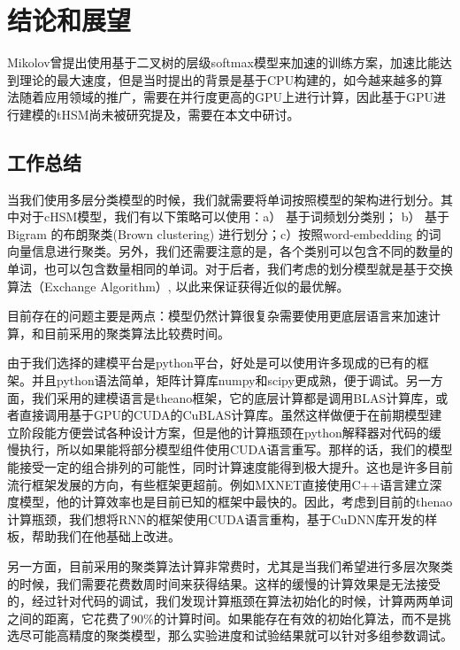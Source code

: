\chapter*{结论和展望}
Mikolov曾提出使用基于二叉树的层级softmax模型来加速的训练方案，加速比能达到理论的最大速度，但是当时提出的背景是基于CPU构建的，如今越来越多的算法随着应用领域的推广，需要在并行度更高的GPU上进行计算，因此基于GPU进行建模的tHSM尚未被研究提及，需要在本文中研讨。
\section*{工作总结}
当我们使用多层分类模型的时候，我们就需要将单词按照模型的架构进行划分。其中对于cHSM模型，我们有以下策略可以使用：a） 基于词频划分类别； b） 基于Bigram 的布朗聚类(Brown clustering) 进行划分；c）按照word-embedding 的词向量信息进行聚类。另外，我们还需要注意的是，各个类别可以包含不同的数量的单词，也可以包含数量相同的单词。对于后者，我们考虑的划分模型就是基于交换算法（Exchange Algorithm）, 以此来保证获得近似的最优解。


目前存在的问题主要是两点：模型仍然计算很复杂需要使用更底层语言来加速计算，和目前采用的聚类算法比较费时间。

由于我们选择的建模平台是python平台，好处是可以使用许多现成的已有的框架。并且python语法简单，矩阵计算库numpy和scipy更成熟，便于调试。另一方面，我们采用的建模语言是theano框架，它的底层计算都是调用BLAS计算库，或者直接调用基于GPU的CUDA的CuBLAS计算库。虽然这样做便于在前期模型建立阶段能方便尝试各种设计方案，但是他的计算瓶颈在python解释器对代码的缓慢执行，所以如果能将部分模型组件使用CUDA语言重写。那样的话，我们的模型能接受一定的组合排列的可能性，同时计算速度能得到极大提升。这也是许多目前流行框架发展的方向，有些框架更超前。例如MXNET直接使用C++语言建立深度模型，他的计算效率也是目前已知的框架中最快的。因此，考虑到目前的thenao计算瓶颈，我们想将RNN的框架使用CUDA语言重构，基于CuDNN库开发的样板，帮助我们在他基础上改进。

另一方面，目前采用的聚类算法计算非常费时，尤其是当我们希望进行多层次聚类的时候，我们需要花费数周时间来获得结果。这样的缓慢的计算效果是无法接受的，经过针对代码的调试，我们发现计算瓶颈在算法初始化的时候，计算两两单词之间的距离，它花费了90\%的计算时间。如果能存在有效的初始化算法，而不是挑选尽可能高精度的聚类模型，那么实验进度和试验结果就可以针对多组参数调试。
